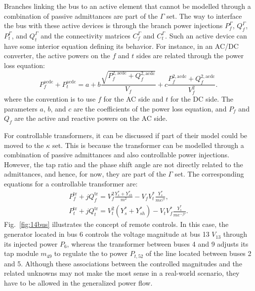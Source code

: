 \documentclass[11pt]{article}
\begin{document}
Branches linking the bus to an active element that cannot be modelled through a combination of passive admittances are part of the $\Gamma$ set. The way to interface the bus with these active devices is through the branch power injections $P_f^\Gamma$, $Q_f^\Gamma$, $P_t^\Gamma$, and $Q_t^\Gamma$ and the connectivity matrices $C_f^\Gamma$ and $C_t^\Gamma$. Such an active device can have some interior equation defining its behavior. For instance, in an AC/DC converter, the active powers on the $f$ and $t$ sides are related through the power loss equation:
\begin{equation}
	P_f^\text{acdc} + P_t^\text{acdc} = a + b\frac{\sqrt{P_f^{2,\text{acdc}} + Q_f^{2,\text{acdc}}}}{V_f} + c\frac{P_f^{2,\text{acdc}} + Q_f^{2,\text{acdc}}}{V_f^2}.	
\end{equation}
where the convention is to use $f$ for the AC side and $t$ for the DC side. The parameters $a$, $b$, and $c$ are the coefficients of the power loss equation, and $P_f$ and $Q_f$ are the active and reactive powers on the AC side. 
 
For controllable transformers, it can be discussed if part of their model could be moved to the $\kappa$ set. This is because the transformer can be modelled through a combination of passive admittances and also controllable power injections. However, the tap ratio and the phase shift angle are not directly related to the admittances, and hence, for now, they are part of the $\Gamma$ set. The corresponding equations for a controllable transformer are:
\begin{equation}
	\begin{aligned}
		P_f^\text{tr} + jQ_f^\text{tr} = V_f^2 \frac{Y_s^* + Y_{sh}^*}{m^2} - V_fV_t^*\frac{Y_s^*}{me^{j\tau}}, \\
		P_t^\text{tr} + jQ_t^\text{tr} = V_t^2 (Y_s^* + Y_{sh}^*) - V_tV_f^*\frac{Y_s^*}{me^{-j\tau}}.
	\end{aligned}
\end{equation}
Fig.~\ref{fig:14bus} illustrates the concept of remote controls. In this case, the generator located in bus 6 controls the voltage magnitude at bus 13 $V_{13}$ through its injected power $P_6$, whereas the transformer between buses 4 and 9 adjusts its tap module $m_{49}$ to regulate the to power $P_{t,52}$ of the line located between buses 2 and 5. Although these associations between the controlled magnitudes and the related unknowns may not make the most sense in a real-world scenario, they have to be allowed in the generalized power flow.
\end{document}
